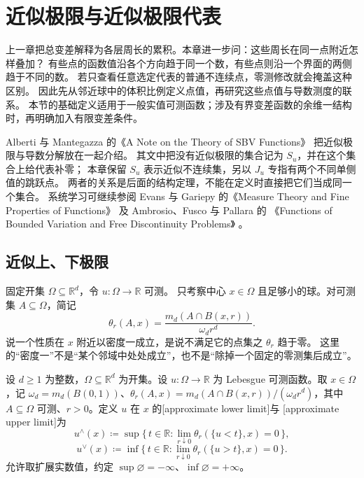 \section{近似极限与近似极限代表}
\label{b1:sec:2801}

上一章把总变差解释为各层周长的累积。本章进一步问：这些周长在同一点附近怎样叠加？
有些点的函数值沿各个方向趋于同一个数，有些点则沿一个界面的两侧趋于不同的数。
若只查看任意选定代表的普通不连续点，零测修改就会掩盖这种区别。
因此先从邻近球中的体积比例定义点值，再研究这些点值与导数测度的联系。
本节的基础定义适用于一般实值可测函数；涉及有界变差函数的余维一结构时，再明确加入有限变差条件。

\ProseParagraphBreak

Alberti 与 Mantegazza 的《A Note on the Theory of SBV Functions》%
\cite[Remark 1.2]{AlbertiMantegazza1997SBV}把近似极限与导数分解放在一起介绍。
其文中把没有近似极限的集合记为 \(S_u\)，并在这个集合上给代表补零；
本章保留 \(S_u\) 表示近似不连续集，另以 \(J_u\) 专指有两个不同单侧值的跳跃点。
两者的关系是后面的结构定理，不能在定义时直接把它们当成同一个集合。
系统学习可继续参阅 Evans 与 Gariepy 的《Measure Theory and Fine Properties of Functions》%
\cite{Evans2015Measure}及 Ambrosio、Fusco 与 Pallara 的%
《Functions of Bounded Variation and Free Discontinuity Problems》%
\cite{Ambrosio2000Functions}。


\subsection{近似上、下极限}
\label{b1:subsec:280101}

固定开集 \(\Omega\subseteq\mathbb R^d\)，令 \(u:\Omega\to\mathbb R\) 可测。
只考察中心 \(x\in\Omega\) 且足够小的球。对可测集 \(A\subseteq\Omega\)，简记
\[
 \theta_r(A,x)=\frac{m_d(A\cap B(x,r))}{\omega_dr^d}.
\]
说一个性质在 \(x\) 附近以密度一成立，是说不满足它的点集之 \(\theta_r\) 趋于零。
这里的“密度一”不是“某个邻域中处处成立”，也不是“除掉一个固定的零测集后成立”。

\begin{definition}\label{b1:def:approximate-upper-lower-limits}
设 \(d\ge1\) 为整数，\(\Omega\subseteq\mathbb R^d\) 为开集。设 \(u:\Omega\to\mathbb R\) 为 Lebesgue 可测函数。取 \(x\in\Omega\)，记 \(\omega_d=m_d(B(0,1))\)、\(\theta_r(A,x)=m_d(A\cap B(x,r))/(\omega_dr^d)\)，其中 \(A\subseteq\Omega\) 可测、\(r>0\)。定义 \(u\) 在 \(x\) 的[approximate lower limit]与%
[approximate upper limit]为
\[
 u^\wedge(x)\coloneqq
 \sup\{\,t\in\mathbb R:\lim_{r\downarrow0}\theta_r(\{u<t\},x)=0\,\},
\]
\[
 u^\vee(x)\coloneqq
 \inf\{\,t\in\mathbb R:\lim_{r\downarrow0}\theta_r(\{u>t\},x)=0\,\}.
\]
允许取扩展实数值，约定 \(\sup\varnothing=-\infty\)、\(\inf\varnothing=+\infty\)。
\end{definition}

